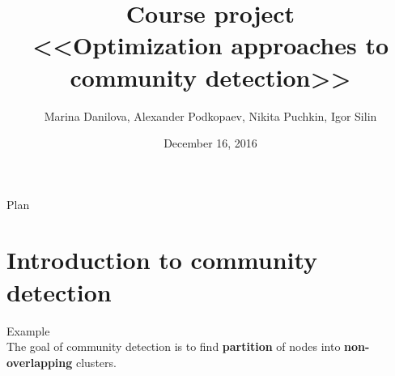 \documentclass{beamer}
\theoremstyle{definition}
\theoremstyle{plain}
\theoremstyle{remark}
\begin{document}
\setlength{\abovedisplayskip}{5pt}
\setlength{\belowdisplayskip}{5pt}

	\title[\hbox to 60mm{Optimization approaches to community detection \hfill\insertframenumber\,/\,15}]
			{ Course project \\ <<Optimization approaches to community detection>>}
	\author[M. Danilova, A. Podkopaev, N. Puchkin, I. Silin]{\large Marina Danilova, Alexander Podkopaev, Nikita Puchkin, Igor Silin}

\date{\footnotesize{December 16, 2016}}

	\begin{frame}
		\titlepage
	\end{frame}

	\begin{frame}{Plan}
		  \tableofcontents[
		    sectionstyle=show/show,
		    subsectionstyle=show/show/show
		  ]
	\end{frame}

	
	\section{Introduction to community detection}

			\begin{frame}{Example}
				\vspace{-17pt}
				\\
				The goal of community detection is to find \textbf{partition} of nodes into \textbf{non-overlapping} clusters.
			\end{frame}
		
\end{document}
